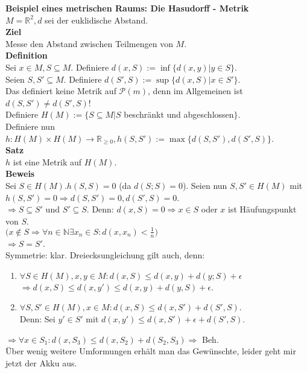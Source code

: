\documentclass{article}
\begin{document}
\textbf{Beispiel eines metrischen Raums: Die Hasudorff - Metrik}\\
$M=\mathbb{R}^2, d$ sei der euklidische Abstand.\\
\textbf{Ziel}\\
Messe den Abstand zwischen Teilmengen von $M$.\\
\textbf{Definition}\\
Sei $x\in M, S\subseteq M$. Definiere $d(x,S) := \inf\{d(x,y)|y\in S\}$.\\
Seien $S,S' \subseteq M$. Definiere $d(S',S) := \sup\{d(x,S)|x\in S'\}$.\\
Das definiert keine Metrik auf $\mathscr{P}(m)$, denn im Allgemeinen ist $d(S,S')\ne d(S',S)$!\\
Definiere $H(M) := \{S\subseteq M | S$ beschränkt und abgeschlossen$\}$.\\
Definiere nun $h: H(M) \times H(M) \rightarrow \mathbb{R}_{\geq 0}, h(S,S') := \max\{d(S,S'),d(S',S)\}$.\\
\textbf{Satz}\\
$h$ ist eine Metrik auf $H(M)$.\\
\textbf{Beweis}\\
Sei $S\in H(M). h(S,S)=0$ (da $d(S;S) = 0$). Seien nun $S,S'\in H(M)$ mit $h(S,S') = 0 \Rightarrow d(S,S')=0, d(S',S)=0$.\\
$\Rightarrow S\subseteq S'$ und $S' \subseteq S$. Denn: $d(x,S) = 0 \Rightarrow x\in S$ oder $x$ ist Häufungspunkt von $S$.\\
$\big(x\notin S \Rightarrow\forall n\in\mathbb{N}\exists x_n\in S:d(x,x_n)<\frac{1}{n}\big)$\\
$\Rightarrow S=S'$.\\
Symmetrie: klar.
Dreiecksungleichung gilt auch, denn:\\
\begin{enumerate}
\item $\forall S\in H(M),x,y\in M : d(x,S)\leq d(x,y)+d(y;S)+\epsilon$\\
$\Rightarrow d(x,S) \leq d(x,y') \leq d(x,y)+d(y,S)+\epsilon$.
\item $\forall S,S' \in H(M),x\in M: d(x,S)\leq d(x,S')+d(S',S)$.\\
Denn: Sei $y'\in S'$ mit $d(x,y') \leq d(x,S')+\epsilon+d(S',S)$.\end{enumerate}
$\Rightarrow \forall x\in S_1 : d(x,S_3) \leq d(x,S_2) + d(S_2,S_3) \Rightarrow$ Beh.\\
Über wenig weitere Umformungen erhält man das Gewünschte, leider geht mir jetzt der Akku aus.
\end{document}
